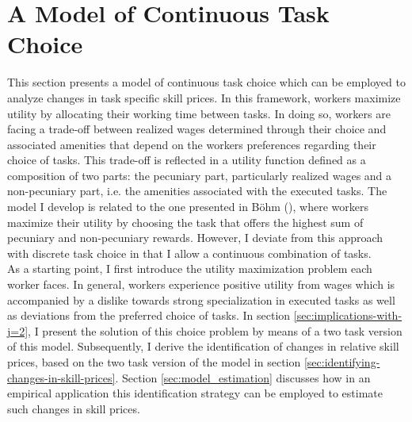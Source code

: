 \documentclass[../main.tex]{subfiles}
\begin{document}
\section{A Model of Continuous Task Choice} \label{sec:tractable-model-of-cont-task-choice}
This section presents a model of continuous task choice which can be employed to analyze changes in task specific skill prices. In this framework, workers maximize utility by allocating  their working time between tasks. In doing so, workers are facing a trade-off between realized wages determined through their choice and associated amenities that depend on the workers preferences regarding their choice of tasks. This trade-off is reflected in a utility function defined as a composition of two parts: the pecuniary part, particularly realized wages and a non-pecuniary part, i.e. the amenities associated with the executed tasks. The model I develop is related to the one presented in Böhm (\citeyear{bohm2019price}), where workers maximize their utility by choosing the task that offers the highest sum of pecuniary and non-pecuniary rewards. However, I deviate from this approach with discrete task choice in that I allow a continuous combination of tasks.
\\
As a starting point, I first introduce the utility maximization problem each worker faces. In general, workers experience positive utility from wages which is accompanied by a dislike towards strong specialization in executed tasks as well as deviations from the preferred choice of tasks. In section \ref{sec:implications-with-j=2}, I present the solution of this choice problem by means of a two task version of this model. Subsequently, I derive the identification of changes in relative skill prices, based on the two task version of the model in section \ref{sec:identifying-changes-in-skill-prices}. Section \ref{sec:model_estimation} discusses how in an empirical application this identification strategy can be employed to estimate such changes in skill prices.
\end{document}
